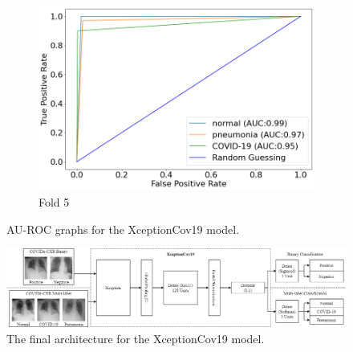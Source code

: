 \begin{figure}
     \vspace{10mm} %
     \begin{subfigure}[b]{0.49\textwidth}
         \centering
         \includegraphics[width=\textwidth]{figures/au-roc-5.png}
         \caption{Fold 5}
         \label{fig:auroc-fold-5}
     \end{subfigure}
        \caption{AU-ROC graphs for the XceptionCov19 model.}
        \label{fig:au-roc-all}
\end{figure}
\begin{landscape}
    \centering
    \vspace*{\fill}
    \begin{figure}[H]
        \centering
        \includegraphics[width=1.5\textwidth]{figures/xceptioncov19.png}
        \caption{The final architecture for the XceptionCov19 model.}
        \label{fig:xceptioncov19}
    \end{figure}
    \vfill
\end{landscape}
